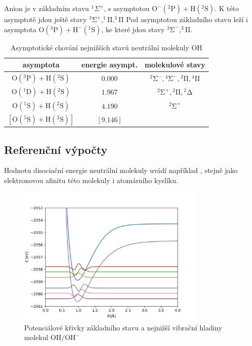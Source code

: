  Anion je v základním stavu $^1\Sigma^+$, s asymptotou
  $\mathrm{O^-}(^2\mathrm{P}) + \mathrm{H}(^2\mathrm{S})$. 
  K této asymptotě jdou ještě stavy
  $\mathrm{^3\Sigma^+,^1\Pi, ^3\Pi}$
 Pod asymptotou základního stavu leží i asymptota 
 $\mathrm{O}(^3\mathrm{P}) + \mathrm{H^-}(^1\mathrm{S})$, 
 ke které jdou stavy $\mathrm{^3\Sigma^-, ^3\Pi}$.

\begin{table}
\centering
\caption{Asymptotické chování nejnižších stavů neutrální molekuly OH}
\label{taOHas}
\bigskip
\begin{tabular}{ccc}
\toprule
asymptota & energie asympt. & molekulové stavy \\ 
\midrule
$\mathrm{O}(^3\mathrm{P}) + \mathrm{H}(^2\mathrm{S})$ & $0.000$ & $\mathrm{^2\Sigma^-}, \mathrm{^4\Sigma^-},\mathrm{^2\Pi},\mathrm{^4\Pi}$ \\ 
$\mathrm{O}(^1\mathrm{D}) + \mathrm{H}(^2\mathrm{S})$ & $1.967$ & $\mathrm{^2\Sigma^+}, \mathrm{^2\Pi}, \mathrm{^2\Delta}$ \\ 
$\mathrm{O}(^1\mathrm{S}) + \mathrm{H}(^2\mathrm{S})$ & $4.190$ & $ \mathrm{^2\Sigma^+}$ \\ 
$[\mathrm{O}(^5\mathrm{S}) + \mathrm{H}(^2\mathrm{S})]$ & $[9.146]$ \\ 
\bottomrule
\end{tabular} 
\end{table}
\subsection{Referenční výpočty}
Hodnotu disociační energie neutrální molekuly uvádí například \cite{CRC_Handbook90}, stejně jako elektronovou afinitu této molekuly i atomárního kyslíku.
\begin{figure}
\centering
\includegraphics[width=0.8\textwidth]{../img/OH-vibr1.png}
\caption{Potenciálové křivky základního stavu a nejnižší vibrační hladiny molekul $\mathrm{OH/OH^-}$}
\label{VibrOH1}
\end{figure}

